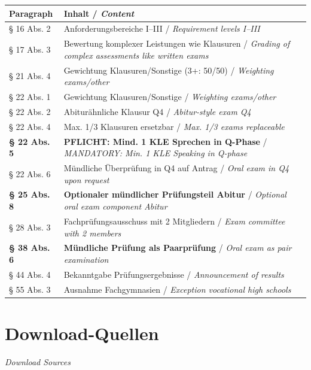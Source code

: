 \documentclass[11pt,a4paper]{article}
\newcommand{\bisection}[2]{%
    \section{#1}%
    {\small\color{englishgray}\textit{#2}}\par\vspace{6pt}%
}
\begin{document}
\begin{center}
\begin{tabularx}{\textwidth}{|l|X|}
\hline
\rowcolor{spanischrot}\color{white}\textbf{Paragraph} & \color{white}\textbf{Inhalt / \textit{Content}} \\
\hline
§ 16 Abs. 2 & Anforderungsbereiche I--III / {\color{englishgray}\textit{Requirement levels I--III}} \\
\hline
§ 17 Abs. 3 & Bewertung komplexer Leistungen wie Klausuren / {\color{englishgray}\textit{Grading of complex assessments like written exams}} \\
\hline
§ 21 Abs. 4 & Gewichtung Klausuren/Sonstige (3+: 50/50) / {\color{englishgray}\textit{Weighting exams/other}} \\
\hline
§ 22 Abs. 1 & Gewichtung Klausuren/Sonstige / {\color{englishgray}\textit{Weighting exams/other}} \\
\hline
§ 22 Abs. 2 & Abiturähnliche Klausur Q4 / {\color{englishgray}\textit{Abitur-style exam Q4}} \\
\hline
§ 22 Abs. 4 & Max. 1/3 Klausuren ersetzbar / {\color{englishgray}\textit{Max. 1/3 exams replaceable}} \\
\hline
\textbf{§ 22 Abs. 5} & \textbf{PFLICHT: Mind. 1 KLE Sprechen in Q-Phase} / {\color{englishgray}\textit{MANDATORY: Min. 1 KLE Speaking in Q-phase}} \\
\hline
§ 22 Abs. 6 & Mündliche Überprüfung in Q4 auf Antrag / {\color{englishgray}\textit{Oral exam in Q4 upon request}} \\
\hline
\textbf{§ 25 Abs. 8} & \textbf{Optionaler mündlicher Prüfungsteil Abitur} / {\color{englishgray}\textit{Optional oral exam component Abitur}} \\
\hline
§ 28 Abs. 3 & Fachprüfungsausschuss mit 2 Mitgliedern / {\color{englishgray}\textit{Exam committee with 2 members}} \\
\hline
\textbf{§ 38 Abs. 6} & \textbf{Mündliche Prüfung als Paarprüfung} / {\color{englishgray}\textit{Oral exam as pair examination}} \\
\hline
§ 44 Abs. 4 & Bekanntgabe Prüfungsergebnisse / {\color{englishgray}\textit{Announcement of results}} \\
\hline
§ 55 Abs. 3 & Ausnahme Fachgymnasien / {\color{englishgray}\textit{Exception vocational high schools}} \\
\hline
\end{tabularx}
\end{center}

\bisection{Download-Quellen}{Download Sources}
\end{document}
